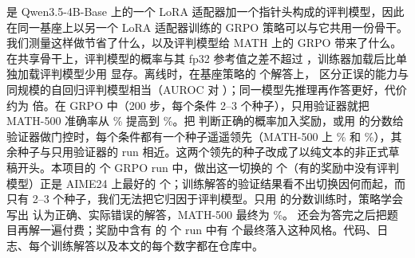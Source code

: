 \kev{} 是 Qwen3.5-4B-Base 上的一个 LoRA 适配器加一个指针头构成的评判模型，因此在同一基座上以另一个 LoRA 适配器训练的 GRPO 策略可以与它共用一份骨干。我们测量这样做节省了什么，以及评判模型给 MATH 上的 GRPO 带来了什么。在共享骨干上，评判模型的概率与其 fp32 参考值之差不超过 ，训练器加载后比单独加载评判模型少用  显存。离线时，在基座策略的  个解答上，\kev{} 区分正误的能力与同规模的自回归评判模型相当（AUROC  对 ）；同一模型先推理再作答更好，代价约为  倍。在 GRPO 中（200 步，每个条件 2--3 个种子），只用验证器就把 MATH-500 准确率从 \% 提高到 \%。把 \kev{} 判断正确的概率加入奖励，或用 \kev{} 的分数给验证器做门控时，每个条件都有一个种子遥遥领先（MATH-500 上 \% 和 \%），其余种子与只用验证器的 run 相近。这两个领先的种子改成了以纯文本的非正式草稿开头。本项目的  个 GRPO run 中，做出这一切换的  个（有的奖励中没有评判模型）正是 AIME24 上最好的  个；训练解答的验证结果看不出切换因何而起，而只有 2--3 个种子，我们无法把它归因于评判模型。只用 \kev{} 的分数训练时，策略学会写出 \kev{} 认为正确、实际错误的解答，MATH-500 最终为 \%。\kev{} 还会为答完之后把题目再解一遍付费；奖励中含有 \kev{} 的  个 run 中有  个最终落入这种风格。代码、日志、每个训练解答以及本文的每个数字都在仓库中。
